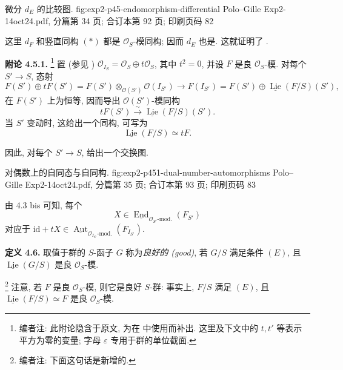   {微分 \(d_E\) 的比较图.}
  {fig:exp2-p45-endomorphism-differential}
  {Polo--Gille Exp2-14oct24.pdf, 分篇第 34 页; 合订本第 92 页; 印刷页码 82}

这里 \(d_F\) 和竖直同构 \((*)\) 都是
\(\mathcal O_S\)-模同构; 因而 \(d_E\) 也是. 这就证明了
.

\medskip
\noindent{}\textbf{附论 4.5.1.}
\footnote{编者注: 此附论隐含于原文, 为在
 中使用而补出.
这里及下文中的 \(t,t'\) 等表示平方为零的变量;
字母 \(\varepsilon\) 专用于群的单位截面.}
置 (参见 )
\(\mathcal O_{I_S}=\mathcal O_S\oplus t\mathcal O_S\), 其中 \(t^2=0\),
并设 \(F\) 是良 \(\mathcal O_S\)-模. 对每个 \(S'\to S\), 态射
\[
 F(S')\oplus tF(S')
 =F(S')\otimes_{\mathcal O(S')}\mathcal O(I_{S'})
 \longrightarrow
 F(I_{S'})
 =F(S')\oplus\underline{\operatorname{Lie}}(F/S)(S'),
\]
在 \(F(S')\) 上为恒等, 因而导出 \(\mathcal O(S')\)-模同构
\[
 tF(S')\xrightarrow{\sim}\underline{\operatorname{Lie}}(F/S)(S').
\]
当 \(S'\) 变动时, 这给出一个同构, 可写为
\[
 \underline{\operatorname{Lie}}(F/S)\simeq tF.
\]

因此, 对每个 \(S'\to S\), 
给出一个交换图.

  {对偶数上的自同态与自同构.}
  {fig:exp2-p451-dual-number-automorphisms}
  {Polo--Gille Exp2-14oct24.pdf, 分篇第 35 页; 合订本第 93 页; 印刷页码 83}

由 4.3 bis 可知, 每个
\[
 X\in
 \underline{\operatorname{End}}_{\mathcal O_{S'}\text{-mod.}}(F_{S'})
\]
对应于
\(\mathrm{id}+tX\in
\underline{\operatorname{Aut}}_{\mathcal O_{I_{S'}}\text{-mod.}}
(F_{I_{S'}})\).

\medskip
\noindent{}\textbf{定义 4.6.}
取值于群的 \(S\)-函子 \(G\) 称为\emph{良好的 (good)},
若 \(G/S\) 满足条件 \((E)\), 且
\(\underline{\operatorname{Lie}}(G/S)\) 是良
\(\mathcal O_S\)-模.

\footnote{编者注: 下面这句话是新增的.}
注意, 若 \(F\) 是良 \(\mathcal O_S\)-模, 则它是良好
\(S\)-群: 事实上, \(F/S\) 满足 \((E)\), 且
\(\underline{\operatorname{Lie}}(F/S)\simeq F\) 是良
\(\mathcal O_S\)-模.

